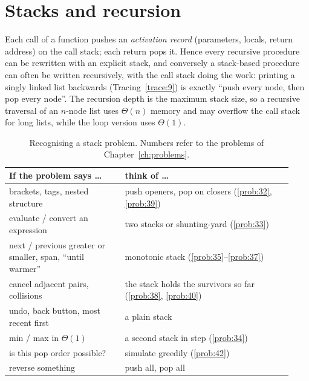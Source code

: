 \section{Stacks and recursion}

Each call of a function pushes an \emph{activation record} (parameters, locals, return
address) on the call stack; each return pops it. Hence every recursive procedure can be
rewritten with an explicit stack, and conversely a stack-based procedure can often be
written recursively, with the call stack doing the work: printing a singly linked list
backwards (Tracing~\ref{trace:9}) is exactly ``push every node, then pop every node''.
The recursion depth is the maximum stack size, so a recursive traversal of an $n$-node
list uses $\Theta(n)$ memory and may overflow the call stack for long lists, while the
loop version uses $\Theta(1)$.

\begin{table}[ht]\centering\small
\begin{tabular}{@{}p{0.38\linewidth}p{0.55\linewidth}@{}}\toprule
If the problem says \dots & think of \dots\\\midrule
brackets, tags, nested structure & push openers, pop on closers (\ref{prob:32}, \ref{prob:39})\\
evaluate / convert an expression & two stacks or shunting-yard (\ref{prob:33})\\
next / previous greater or smaller, span, ``until warmer'' & monotonic stack (\ref{prob:35}--\ref{prob:37})\\
cancel adjacent pairs, collisions & the stack holds the survivors so far (\ref{prob:38}, \ref{prob:40})\\
undo, back button, most recent first & a plain stack\\
min / max in $\Theta(1)$ & a second stack in step (\ref{prob:34})\\
is this pop order possible? & simulate greedily (\ref{prob:42})\\
reverse something & push all, pop all\\\bottomrule
\end{tabular}
\caption{Recognising a stack problem. Numbers refer to the problems of
Chapter~\ref{ch:problems}.}
\end{table}
